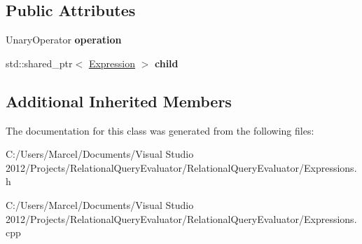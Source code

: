 \subsection*{Public Attributes}
\begin{DoxyCompactItemize}
\item 
\hypertarget{class_unary_expression_af585b4a298cc9b170e26bdc0809c5175}{Unary\+Operator {\bfseries operation}}\label{class_unary_expression_af585b4a298cc9b170e26bdc0809c5175}

\item 
\hypertarget{class_unary_expression_ae9f51f996e3ec7f389dfce2105128eaf}{std\+::shared\+\_\+ptr$<$ \hyperlink{class_expression}{Expression} $>$ {\bfseries child}}\label{class_unary_expression_ae9f51f996e3ec7f389dfce2105128eaf}

\end{DoxyCompactItemize}
\subsection*{Additional Inherited Members}


The documentation for this class was generated from the following files\+:\begin{DoxyCompactItemize}
\item 
C\+:/\+Users/\+Marcel/\+Documents/\+Visual Studio 2012/\+Projects/\+Relational\+Query\+Evaluator/\+Relational\+Query\+Evaluator/Expressions.\+h\item 
C\+:/\+Users/\+Marcel/\+Documents/\+Visual Studio 2012/\+Projects/\+Relational\+Query\+Evaluator/\+Relational\+Query\+Evaluator/Expressions.\+cpp\end{DoxyCompactItemize}
